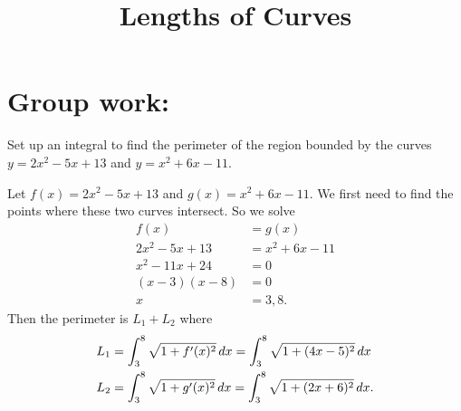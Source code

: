 \documentclass[]{ximera}
\title{Lengths of Curves}
\begin{document}
\begin{abstract}		\end{abstract}
\maketitle



\begin{comment}
\section{Warm up:}

	\begin{freeResponse}
	
	\end{freeResponse}
	
\begin{instructorNotes}

\end{instructorNotes}
\end{comment}







\section{Group work:}



\begin{problem}
Set up an integral to find the perimeter of the region bounded by the curves $y=2x^2-5x+13$ and $y=x^2+6x-11$.
	\begin{freeResponse}
	Let $f(x) = 2x^2-5x+13$ and $g(x) = x^2+6x-11$.
	We first need to find the points where these two curves intersect.  
	So we solve
		\begin{align*}
		f(x) &= g(x)  \\
		2x^2-5x+13 &= x^2+6x-11  \\
		x^2-11x+24 &= 0  \\
		(x-3)(x-8) &= 0  \\
		x &= 3,8.
		\end{align*}
	Then the perimeter is $L_1 + L_2$ where
		\begin{align*}
		L_1 &= \int_3^8 \sqrt{1+f'(x)^2} \,d x = \int_3^8 \sqrt{1+(4x-5)^2} \,d x  \\
		L_2 &= \int_3^8 \sqrt{1+g'(x)^2} \,d x = \int_3^8 \sqrt{1+(2x+6)^2} \,d x.
		\end{align*}	
	\end{freeResponse}
	
\end{problem}
\end{document}
